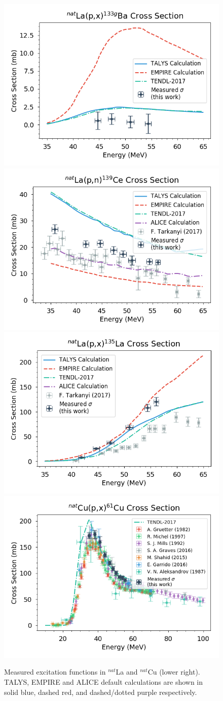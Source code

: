 \documentclass[final]{beamer}
\newlength{\onecolwid}
\newlength{\threecolwid}
\begin{document}
\begin{frame}[t]
\begin{columns}[t]
\begin{column}{\threecolwid}
\begin{figure}
\includegraphics[width=0.32\linewidth]{cross_sections/133BAg.png}\\
\includegraphics[width=0.32\linewidth]{cross_sections/139CE.png}
\includegraphics[width=0.32\linewidth]{cross_sections/135LA.png}
\includegraphics[width=0.32\linewidth]{cross_sections/61CU.png}
\caption{\hspace*{15pt}Measured excitation functions in $^{nat}$La and $^{nat}$Cu (lower right).  TALYS, EMPIRE and ALICE default calculations are shown in solid blue, dashed red, and dashed/dotted purple respectively.}
\end{figure}

\begin{columns}[t,totalwidth=\threecolwid] %
\begin{column}{\onecolwid} %

\begin{block}


\end{block}
\end{column}
\end{columns}
\end{column}
\end{columns}
\end{frame}
\end{document}
